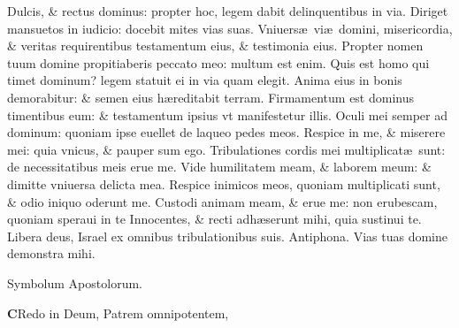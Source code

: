 \documentclass[a5paper,10pt]{book}
\def\ae{æ}
\begin{document}
\begin{multicols*}{2}
\newline \color{red} D\color{black}ulcis, \& rectus dominus: propter hoc, legem dabit delinquentibus in via.
\newline \color{red} D\color{black}iriget mansuetos in iudicio: docebit mites vias suas.
\newline \color{red} V\color{black}niuers\ae \ vi\ae \ domini, misericordia, \& veritas requirentibus testamentum eius, \& testimonia eius.
\newline \color{red} P\color{black}ropter nomen tuum domine propitiaberis peccato meo: multum est enim.
\newline \color{red} Q\color{black}uis est homo qui timet dominum? legem statuit ei in via quam elegit.
\newline \color{red} A\color{black}nima eius in bonis demorabitur: \& semen eius h\ae reditabit terram.
\newline \color{red} F\color{black}irmamentum est dominus timentibus eum: \& testamentum ipsius vt manifestetur illis.
\newline \color{red} O\color{black}culi mei semper ad dominum: quoniam ipse euellet de laqueo pedes meos.
\newline \color{red} R\color{black}espice in me, \& miserere mei: quia vnicus, \& pauper sum ego.
\newline \color{red} T\color{black}ribulationes cordis mei multiplicat\ae \ sunt: de necessitatibus meis erue me.
\newline \color{red} V\color{black}ide humilitatem meam, \& laborem meum: \& dimitte vniuersa delicta mea.
\newline \color{red} R\color{black}espice inimicos meos, quoniam multiplicati sunt, \& odio iniquo oderunt me.
\newline \color{red} C\color{black}ustodi animam meam, \& erue me: non erubescam, quoniam speraui in te%
\newline \color{red} I\color{black}nnocentes, \& recti adh\ae serunt mihi, quia sustinui te.
\newline \color{red} L\color{black}ibera deus, Israel ex omnibus tribulationibus suis. \quad \color{red} Antiphona. \color{black} Vias tuas domine demonstra mihi. \color{black}
\vspace{-1em}
\begin{center} \color{red}
Symbolum Apostolorum.
\end{center}
\vspace{-1em}
\lettrine[lines=2]{\bfseries \color{red} C}{}Redo in Deum, 
\color{red} P\color{black}atrem omnipotentem,

\end{multicols*}
\end{document}
